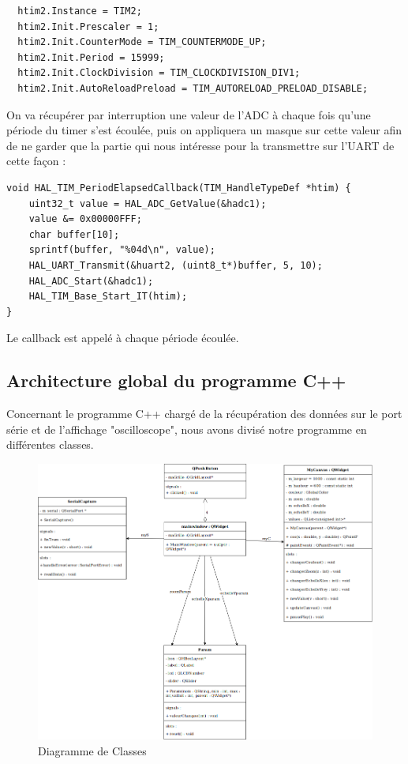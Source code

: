 \documentclass[11pt, french]{article}
\begin{document}
\vspace{3mm}
\begin{lstlisting}
  htim2.Instance = TIM2;
  htim2.Init.Prescaler = 1;
  htim2.Init.CounterMode = TIM_COUNTERMODE_UP;
  htim2.Init.Period = 15999;
  htim2.Init.ClockDivision = TIM_CLOCKDIVISION_DIV1;
  htim2.Init.AutoReloadPreload = TIM_AUTORELOAD_PRELOAD_DISABLE;
\end{lstlisting}
\newpage

On va récupérer par interruption une valeur de l'ADC à chaque fois qu'une période du timer s'est écoulée, puis on appliquera un masque sur cette valeur afin de ne garder que la partie qui nous intéresse pour la transmettre sur l'UART de cette façon :

\vspace{3mm}
\begin{lstlisting}
void HAL_TIM_PeriodElapsedCallback(TIM_HandleTypeDef *htim) {
	uint32_t value = HAL_ADC_GetValue(&hadc1);
	value &= 0x00000FFF;
	char buffer[10];
	sprintf(buffer, "%04d\n", value);
	HAL_UART_Transmit(&huart2, (uint8_t*)buffer, 5, 10);
	HAL_ADC_Start(&hadc1);
	HAL_TIM_Base_Start_IT(htim);
}
\end{lstlisting}

Le callback est appelé à chaque période écoulée.

\newpage

\subsection{Architecture global du programme C++}

Concernant le programme C++ chargé de la récupération des données sur le port série et de l'affichage "oscilloscope", nous avons divisé notre programme en différentes classes.

\vspace*{0.1cm}
\begin{figure}[htb]
\centering
\includegraphics[width=17cm]{diagrammeclass.png}
\caption{Diagramme de Classes}
\label{fig:classdiag}
\end{figure}
\vspace*{0.1cm}
\end{document}
